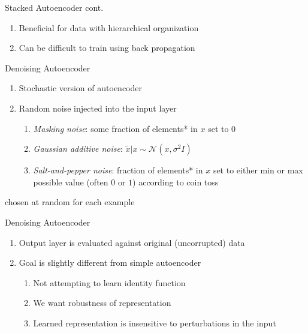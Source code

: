 \documentclass[pdf]{beamer}
\begin{document}
		\begin{frame} {Stacked Autoencoder cont.}
		\begin{enumerate}
			\item Beneficial for data with hierarchical organization
			\item Can be difficult to train using back propagation 
		\end{enumerate}
		\end{frame}



			\begin{frame}{Denoising Autoencoder}
			\begin{enumerate}
				\item Stochastic version of autoencoder
				\item Random noise injected into the input layer
				\begin{enumerate}[1]
					\item \textit{Masking noise}: some fraction of elements* in $x$ set to $0$ 
					\item \textit{Gaussian additive noise}: $\tilde{x}|x \sim \mathcal{N}(x, \sigma^2I) $
					\item \textit{Salt-and-pepper noise}: fraction of elements* in $x$ set to either min or max possible value (often $0$ or $1$) according to coin toss
				\end{enumerate}
			\end{enumerate}
			\vspace{5em}
			\hspace{2em} {\tiny * chosen at random for each example}
			\end{frame}
			
	
			
			\begin{frame}{Denoising Autoencoder}
			\begin{enumerate}
				\item Output layer is evaluated against original (uncorrupted) data
				\item Goal is slightly different from simple autoencoder
				\begin{enumerate}[1]
					\item Not attempting to learn identity function
					\item We want robustness of representation
					\item Learned representation is insensitive to perturbations in the input
				\end{enumerate}
			\end{enumerate}
			\end{frame}
			
\end{document}
